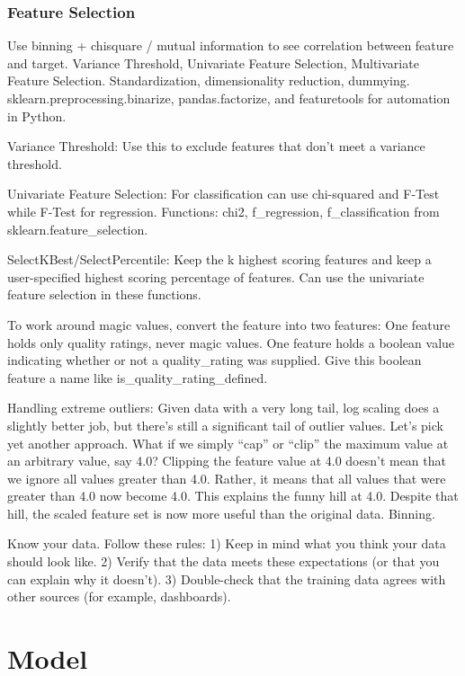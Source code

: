 \documentclass[]{book}
\begin{document}
\hypertarget{feature-selection}{%
\subsection{Feature Selection}\label{feature-selection}}

Use binning + chisquare / mutual information to see correlation between feature and target. Variance Threshold, Univariate Feature Selection, Multivariate Feature Selection. Standardization, dimensionality reduction, dummying. sklearn.preprocessing.binarize, pandas.factorize, and featuretools for automation in Python.

Variance Threshold: Use this to exclude features that don't meet a variance threshold.

Univariate Feature Selection: For classification can use chi-squared and F-Test while F-Test for regression. Functions: chi2, f\_regression, f\_classification from sklearn.feature\_selection.

SelectKBest/SelectPercentile: Keep the k highest scoring features and keep a user-specified highest scoring percentage of features. Can use the univariate feature selection in these functions.

To work around magic values, convert the feature into two features: One feature holds only quality ratings, never magic values. One feature holds a boolean value indicating whether or not a quality\_rating was supplied. Give this boolean feature a name like is\_quality\_rating\_defined.

Handling extreme outliers: Given data with a very long tail, log scaling does a slightly better job, but there's still a significant tail of outlier values. Let's pick yet another approach. What if we simply ``cap'' or ``clip'' the maximum value at an arbitrary value, say 4.0? Clipping the feature value at 4.0 doesn't mean that we ignore all values greater than 4.0. Rather, it means that all values that were greater than 4.0 now become 4.0. This explains the funny hill at 4.0. Despite that hill, the scaled feature set is now more useful than the original data. Binning.

Know your data. Follow these rules: 1) Keep in mind what you think your data should look like. 2) Verify that the data meets these expectations (or that you can explain why it doesn't). 3) Double-check that the training data agrees with other sources (for example, dashboards).

\hypertarget{model-1}{%
\chapter{Model}\label{model-1}}
\end{document}
